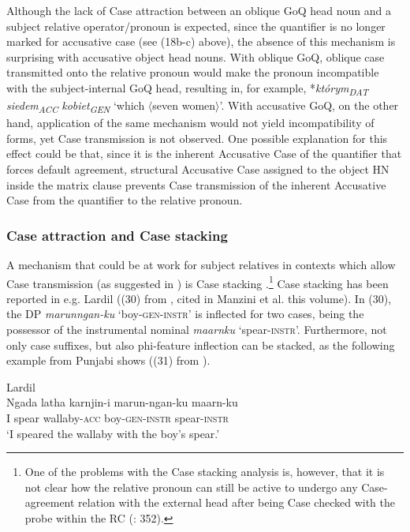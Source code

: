 \documentclass[output=paper]{langsci/langscibook}
\begin{document}
Although the lack of Case attraction between an oblique GoQ head noun and a subject relative operator/pronoun is expected, since the quantifier is no longer marked for accusative case (see (18b-c) above), the absence of this mechanism is surprising with accusative object head nouns. With oblique GoQ, oblique case transmitted onto the relative pronoun would make the pronoun incompatible with the subject-internal GoQ head, resulting in, for example, *\textit{którym\textsubscript{DAT}} \textit{siedem\textsubscript{ACC}} \textit{kobiet\textsubscript{GEN}} ‘which $\langle$seven women$\rangle$’. With accusative GoQ, on the other hand, application of the same mechanism would not yield incompatibility of forms, yet Case transmission is not observed. One possible explanation for this effect could be that, since it is the inherent Accusative Case of the quantifier that forces default agreement, structural Accusative Case assigned to the object HN inside the matrix clause prevents Case transmission of the inherent Accusative Case from the quantifier to the relative pronoun. 

\subsubsection{Case attraction and Case stacking}%

A mechanism that could be at work for subject relatives in contexts which allow Case transmission (as suggested in \citealt{Łęska2016}) is Case stacking \citep{Vogel2001}.\footnote{One of the problems with the Case stacking analysis is, however, that it is not clear how the relative pronoun can still be active to undergo any Case-agreement relation with the external head after being Case checked with the probe within the RC (\citealt{Georgi2014}: 352).} Case stacking has been reported in e.g. Lardil ((30) from \citealt{Richards2013}, cited in Manzini et al. this volume). In (30), the DP \textit{marunngan-ku} ‘boy-\textsc{gen-instr}’ is inflected for two cases, being the possessor of the instrumental nominal \textit{maarnku} ‘spear\textsc{{}-instr}’. Furthermore, not only case suffixes, but also phi-feature inflection can be stacked, as the following example from Punjabi shows ((31) from \citealt[316]{Manzini2015}). 

\ea%
         Lardil\label{ex:leska:30}\\
    \gll Ngada   latha   karnjin-i   marun-ngan-ku   maarn-ku   \\
         I     spear   wallaby-\textsc{acc} boy-\textsc{gen-instr}   spear-\textsc{instr}\\
    \glt ‘I speared the wallaby with the boy’s spear.’
    \z
\end{document}
